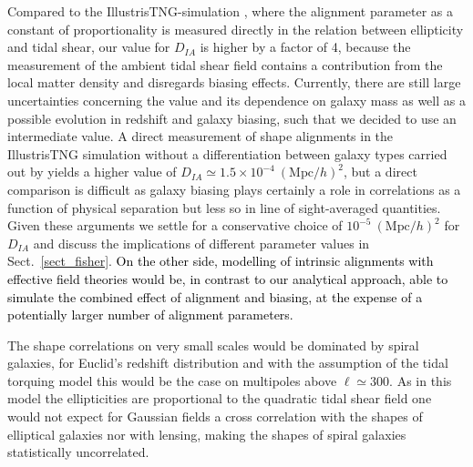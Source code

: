 \documentclass[a4paper,fleqn,usenatbib]{mnras}
\newcommand\spirou[1]{\textcolor{black}{#1}}
\begin{document}
Compared to the IllustrisTNG-simulation \citep{Zjupa_tng_2020}, where the alignment parameter as a constant of proportionality is measured directly in the relation between ellipticity and tidal shear, our value for $D_{IA}$ is higher by a factor of 4, because the measurement of the ambient tidal shear field contains a contribution from the local matter density and disregards biasing effects. Currently, there are still large uncertainties concerning the value and its dependence on galaxy mass as well as a possible evolution in redshift and galaxy biasing, such that we decided to use an intermediate value. A direct measurement of shape alignments in the IllustrisTNG simulation without a differentiation between galaxy types carried out by \citet{hilbert_intrinsic_2016} yields a higher value of $D_{IA}\simeq1.5\times10^{-4}~(\mathrm{Mpc}/h)^2$, but a direct comparison is difficult as galaxy biasing plays certainly a role in correlations as a function of physical separation but less so in line of sight-averaged quantities. Given these arguments we settle for a conservative choice of $10^{-5}~(\mathrm{Mpc}/h)^2$ for $D_{IA}$ and discuss the implications of different parameter values in Sect.~\ref{sect_fisher}. \spirou{On the other side, modelling of intrinsic alignments with effective field theories \cite{PhysRevD.100.103506,fang_fast-pt_2017} would be, in contrast to our analytical approach, able to simulate the combined effect of alignment and biasing, at the expense of a potentially larger number of alignment parameters.}

The shape correlations on very small scales would be dominated by spiral galaxies, for Euclid's redshift distribution and with the assumption of the tidal torquing model this would be the case on multipoles above $\ell\simeq 300$. As in this model the ellipticities are proportional to the quadratic tidal shear field one would not expect for Gaussian fields a cross correlation with the shapes of elliptical galaxies nor with lensing, making the shapes of spiral galaxies statistically uncorrelated.
\end{document}
